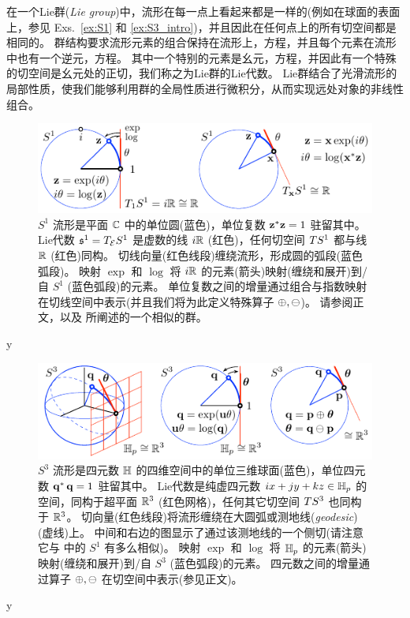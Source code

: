 在一个Lie群(\emph{Lie group})中，流形在每一点上看起来都是一样的(例如在球面的表面上，参见 Exs.~\ref{ex:S1} 和 \ref{ex:S3_intro})，并且因此在任何点上的所有切空间都是相同的。 
群结构要求流形元素的组合保持在流形上，方程，并且每个元素在流形中也有一个逆元，方程。
其中一个特别的元素是幺元，方程，并因此有一个特殊的切空间是幺元处的正切，我们称之为Lie群的Lie代数。
Lie群结合了光滑流形的局部性质，使我们能够利用群的全局性质进行微积分，从而实现远处对象的非线性组合。


%
%
\begin{figure}[tb]
\centering
\includegraphics{figures/manifold_z}
\caption{$S^1$ 流形是平面 ${\mathbb C}$ 中的单位圆(蓝色)，单位复数 ${\bf z}^*{\bf z}=1$ 驻留其中。 
Lie代数 $\frak{s}^1=T_{\mathcal{E}}{S^1}$ 是虚数的线 $i{\mathbb R}$ (红色)，任何切空间 $TS^1$ 都与线 ${\mathbb R}$ (红色)同构。
切线向量(红色线段)缠绕流形，形成圆的弧段(蓝色弧段)。
映射 $\exp$ 和 $\log$ 将 $i{\mathbb R}$ 的元素(箭头)映射(缠绕和展开)到/自 $S^1$ (蓝色弧段)的元素。
单位复数之间的增量通过组合与指数映射在切线空间中表示(并且我们将为此定义特殊算子 $\oplus,\ominus$)。
请参阅正文，以及  所阐述的一个相似的群。
}
\label{fig:manifold_z}
\end{figure}
%

\if\examples y

\fi

\begin{figure}[t]
\centering
\includegraphics{figures/manifold_q}
\caption{$S^3$ 流形是四元数 ${\mathbb H}$ 的四维空间中的单位三维球面(蓝色)，单位四元数 ${\bf q}^*\,{\bf q}=1$ 驻留其中。
Lie代数是纯虚四元数 $ix+jy+kz\in{\mathbb H}_p$ 的空间，同构于超平面 ${\mathbb R}^3$ (红色网格)，任何其它切空间 $TS^3$ 也同构于 ${\mathbb R}^3$。
切向量(红色线段)将流形缠绕在大圆弧或测地线(\emph{geodesic})(虚线)上。
中间和右边的图显示了通过该测地线的一个侧切(请注意它与  中的 $S^1$ 有多么相似)。
映射 $\exp$ 和 $\log$ 将 ${\mathbb H}_p$ 的元素(箭头)映射(缠绕和展开)到/自 $S^3$ (蓝色弧段)的元素。
四元数之间的增量通过算子 $\oplus,\ominus$ 在切空间中表示(参见正文)。
}
\label{fig:manifold_q}
\end{figure}
%
\if\examples y

\fi



